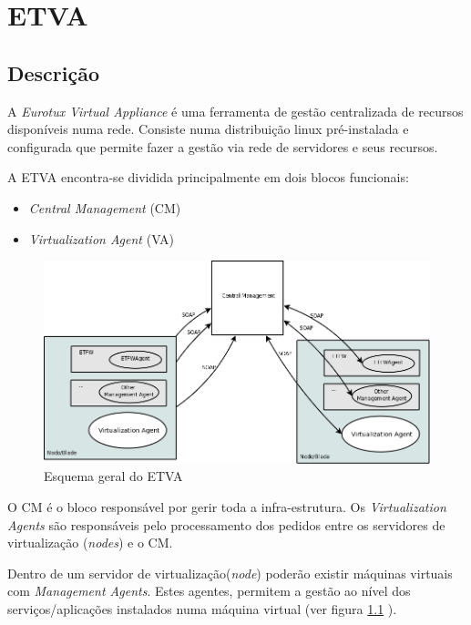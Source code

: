 \chapter{\textsf{ETVA}}
\section{Descrição}
A \emph{Eurotux Virtual Appliance} é uma ferramenta de gestão centralizada de recursos disponíveis numa rede. Consiste numa distribuição linux pré-instalada e configurada que permite fazer a gestão via rede de servidores e seus recursos.


A ETVA encontra-se dividida principalmente em dois blocos funcionais:

\begin{itemize}
	\item \emph{Central Management} (CM)
        \item \emph{Virtualization Agent} (VA)
\end{itemize}

\begin{figure}[H]
	\begin{center}
	\includegraphics[scale=0.35]{screenshots/etva_blocos.png}
	\caption{Esquema geral do ETVA}
	\label{fig:etva_blocos}
	\end{center}
\end{figure}

O CM é o bloco responsável por gerir toda a infra-estrutura.
Os \emph{Virtualization Agents} são responsáveis pelo processamento dos pedidos entre os servidores de virtualização (\emph{nodes}) e o CM.

Dentro de um servidor de virtualização(\emph{node}) poderão existir máquinas virtuais com \emph{Management Agents}. Estes agentes, permitem a gestão ao nível dos serviços/aplicações instalados numa máquina virtual (ver figura \ref{fig:etva_blocos} ).

